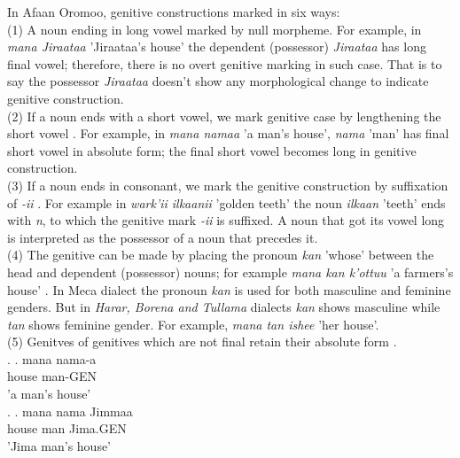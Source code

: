 \documentclass[11pt,a4paper]{article}
\begin{document}
	In Afaan Oromoo, genitive constructions marked in six ways:\\
	
	(1) A noun ending in long vowel marked by null morpheme. For example,  in \emph{mana Jiraataa} 'Jiraataa's house' the dependent (possessor) \emph{Jiraataa} has long final vowel; therefore, there is no overt genitive marking in such case. That is to say the possessor \emph{Jiraataa} doesn't show any morphological change to indicate genitive construction. \\
	
	(2) If a noun ends with a short vowel, we mark genitive case by lengthening the short vowel \cite[183]{gragg1976oromo,gobena2019verb}. For example, in \emph{mana namaa} 'a man's house', \emph{nama} 'man' has final short vowel in absolute form; the final short vowel becomes long in genitive construction. \\
	
	(3) If a noun ends in consonant, we mark the genitive construction by suffixation of \emph{-ii} \cite{gobena2019verb}. For example in \emph{wark'ii ilkaanii} 'golden teeth' the noun \emph{ilkaan} 'teeth' ends with \emph{n}, to which the genitive mark \emph{-ii} is suffixed. A noun that got its vowel long is interpreted as the possessor of a noun that precedes it. \\
	
	(4) The genitive can be made by placing the pronoun \emph{kan} 'whose' between the head and dependent (possessor) nouns; for example \emph{mana kan k'ottuu} 'a farmers's house' \cite[183]{gragg1976oromo}. In Meca dialect the pronoun \emph{kan} is used for both masculine and feminine genders. But in \emph{Harar, Borena and Tullama} dialects \emph{kan} shows masculine while \emph{tan} shows feminine gender. For example, \emph{mana tan ishee} 'her house'. \\
	
	(5) Genitves of genitives which are not final retain their absolute form \cite[104]{owens1985grammar}. \\
	
	\ex.
	\ag.
	mana nama-a \\
	house man-GEN\\
	'a man's house'\\
	
	\ex.
	\ag.
	mana nama Jimmaa \\
	house man Jima.GEN\\
	'Jima man's house'\\
	
\end{document}
